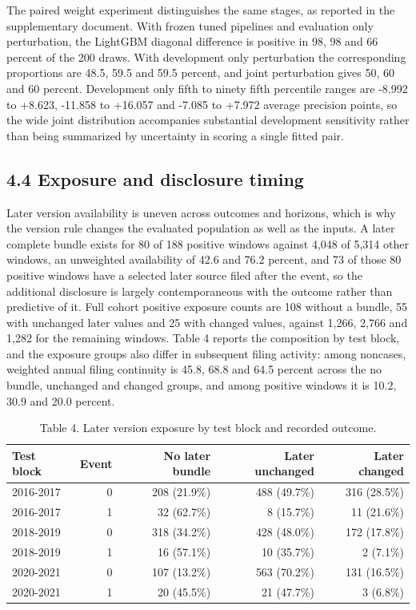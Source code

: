\documentclass[10pt,a4paper,twocolumn]{article}
\begin{document}
The paired weight experiment distinguishes the same stages, as reported in the supplementary document. With frozen tuned pipelines and evaluation only perturbation, the LightGBM diagonal difference is positive in 98, 98 and 66 percent of the 200 draws. With development only perturbation the corresponding proportions are 48.5, 59.5 and 59.5 percent, and joint perturbation gives 50, 60 and 60 percent. Development only fifth to ninety fifth percentile ranges are -8.992 to +8.623, -11.858 to +16.057 and -7.085 to +7.972 average precision points, so the wide joint distribution accompanies substantial development sensitivity rather than being summarized by uncertainty in scoring a single fitted pair.

\subsection{4.4 Exposure and disclosure timing}

Later version availability is uneven across outcomes and horizons, which is why the version rule changes the evaluated population as well as the inputs. A later complete bundle exists for 80 of 188 positive windows against 4,048 of 5,314 other windows, an unweighted availability of 42.6 and 76.2 percent, and 73 of those 80 positive windows have a selected later source filed after the event, so the additional disclosure is largely contemporaneous with the outcome rather than predictive of it. Full cohort positive exposure counts are 108 without a bundle, 55 with unchanged later values and 25 with changed values, against 1,266, 2,766 and 1,282 for the remaining windows. Table 4 reports the composition by test block, and the exposure groups also differ in subsequent filing activity: among noncases, weighted annual filing continuity is 45.8, 68.8 and 64.5 percent across the no bundle, unchanged and changed groups, and among positive windows it is 10.2, 30.9 and 20.0 percent.

\begin{table}[tbp]
\centering
\footnotesize
\caption{Table 4. Later version exposure by test block and recorded outcome.}
\label{main-tab-3}
\begin{tabular}{lrrrr}
\toprule
Test block & Event & No later bundle & Later unchanged & Later changed \\
\midrule
2016-2017 & 0 & 208 (21.9\%) & 488 (49.7\%) & 316 (28.5\%) \\
2016-2017 & 1 & 32 (62.7\%) & 8 (15.7\%) & 11 (21.6\%) \\
2018-2019 & 0 & 318 (34.2\%) & 428 (48.0\%) & 172 (17.8\%) \\
2018-2019 & 1 & 16 (57.1\%) & 10 (35.7\%) & 2 (7.1\%) \\
2020-2021 & 0 & 107 (13.2\%) & 563 (70.2\%) & 131 (16.5\%) \\
2020-2021 & 1 & 20 (45.5\%) & 21 (47.7\%) & 3 (6.8\%) \\
\bottomrule
\end{tabular}
\end{table}
\end{document}
